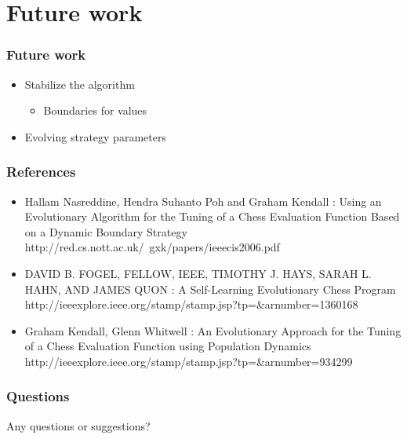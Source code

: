 \documentclass{beamer}
\begin{document}
\section{Future work}
\begin{frame}
\tableofcontents[currentsection]
\end{frame}

\begin{frame}
\frametitle{Future work}
\begin{itemize}
\item Stabilize the algorithm
\begin{itemize}
\item Boundaries for values
\end{itemize}
\item Evolving strategy parameters
\end{itemize}
\end{frame}

\begin{frame}
\frametitle{References}
\begin{itemize}
\item Hallam Nasreddine, Hendra Suhanto Poh and Graham Kendall : Using an Evolutionary Algorithm for the Tuning of a Chess Evaluation Function Based on a Dynamic Boundary Strategy\\
http://red.cs.nott.ac.uk/~gxk/papers/ieeecis2006.pdf

\item DAVID B. FOGEL, FELLOW, IEEE, TIMOTHY J. HAYS, SARAH L. HAHN, AND JAMES QUON : A Self-Learning Evolutionary Chess Program\\
http://ieeexplore.ieee.org/stamp/stamp.jsp?tp=\&arnumber=1360168

\item Graham Kendall, Glenn Whitwell : An Evolutionary Approach for the Tuning of a
Chess Evaluation Function using Population Dynamics\\
http://ieeexplore.ieee.org/stamp/stamp.jsp?tp=\&arnumber=934299
\end{itemize}
\end{frame}

\begin{frame}
\frametitle{Questions}
\begin{center}
\begin{Huge}
Any questions or suggestions?
\end{Huge}
\end{center}
\end{frame}
\end{document}
